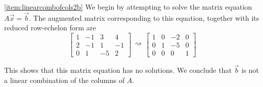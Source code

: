 \documentclass{ximera}
\begin{document}
\begin{example}
\begin{explanation}
\ref{item:linearcombofcols2b}   We begin by attempting to solve the matrix equation  $A\vec{x}=\vec{b}$.  The augmented matrix corresponding to this equation, together with its reduced row-echelon form are
$$\left[\begin{array}{ccc|c}  
 1&-1&3&4\\2&-1&1&-1\\0&1&-5&2
 \end{array}\right]\begin{array}{c}
 \\
 \rightsquigarrow\\
 \\
 \end{array}\left[\begin{array}{ccc|c}  
 1&0&-2&0\\0&1&-5&0\\0&0&0&1
 \end{array}\right]$$

This shows that this matrix equation has no solutions.  We conclude that $\vec{b}$ is not a linear combination of the columns of $A$. 

\end{explanation}
\end{example}
\end{document}
